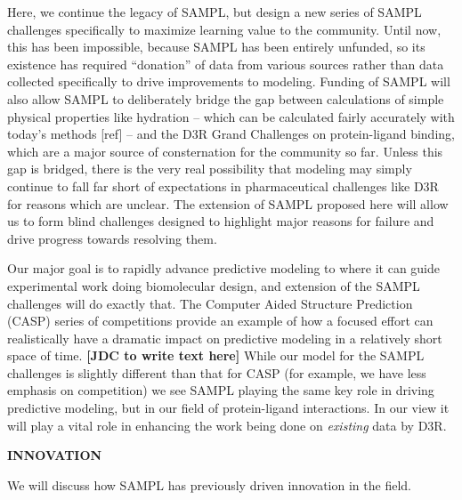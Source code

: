 \documentclass[11pt]{article}
\begin{document}
Here, we continue the legacy of SAMPL, but design a new series of SAMPL challenges specifically to maximize learning value to the community.
Until now, this has been impossible, because SAMPL has been entirely unfunded, so its existence has required ``donation'' of data from various sources rather than data collected specifically to drive improvements to modeling. 
Funding of SAMPL will also allow SAMPL to deliberately bridge the gap between calculations of simple physical properties like hydration -- which can be calculated fairly accurately with today's methods [ref] -- 
and the D3R Grand Challenges on protein-ligand binding, which are a major source of consternation for the community so far.
Unless this gap is bridged, there is the very real possibility that modeling may simply continue to fall far short of expectations in pharmaceutical challenges like D3R for reasons which are unclear.
The extension of SAMPL proposed here will allow us to form blind challenges designed to highlight major reasons for failure and drive progress towards resolving them.

Our major goal is to rapidly advance predictive modeling to where it can guide experimental work doing biomolecular design, and extension of the SAMPL challenges will do exactly that.
The Computer Aided Structure Prediction (CASP) series of competitions provide an example of how a focused effort can realistically have a dramatic impact on predictive modeling in a relatively short space of time.  {\bf [JDC to write text here]}
While our model for the SAMPL challenges is slightly different than that for CASP (for example, we have less emphasis on competition) we see SAMPL playing the same key role in driving predictive modeling, but in our field of protein-ligand interactions. 
In our view it will play a vital role in enhancing the work being done on \emph{existing} data by D3R. 



{\large \bf INNOVATION}

We will discuss how SAMPL has previously driven innovation in the field.
\end{document}

